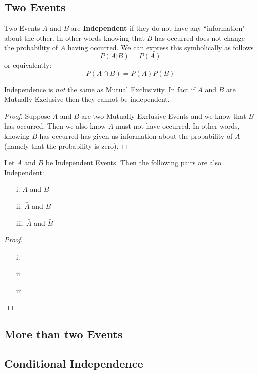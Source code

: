 \documentclass{report}
\begin{document}
\subsection{Two Events}
Two Events $A$ and $B$ are \textbf{Independent} if they do not have any ``information" about the other. In other words knowing that $B$ has occurred does not change the probability of $A$ having occurred. We can express this symbolically as follows
\[
    P(A|B)=P(A)
\]
or equivalently:
\[
    P(A\cap B)=P(A)P(B)
\]
\begin{notsofast}
    Independence is \emph{not} the same as Mutual Exclusivity. In fact if $A$ and $B$ are Mutually Exclusive then they cannot be independent. 
    \begin{proof}
        Suppose $A$ and $B$ are two Mutually Exclusive Events and we know that $B$ has occurred. Then we also know $A$ must not have occurred. In other words, knowing $B$ has occurred has given us information about the probability of $A$ (namely that the probability is zero). 
    \end{proof}
\end{notsofast}

\begin{lemma}
Let $A$ and $B$ be Independent Events. Then the following pairs are also Independent:
\begin{enumerate}
    \item[i.] $A$ and $\bar B$
    \item[ii.] $\bar A$ and $B$
    \item[iii.] $\bar A$ and $\bar B$
\end{enumerate}
\tcblower
\begin{proof}
    \begin{enumerate}
        \item[]
        \item[i.] 
        \item[ii.] 
        \item[iii.] 
    \end{enumerate}
\end{proof}
\end{lemma}

\subsection{More than two Events}

\subsection{Conditional Independence}
\end{document}
